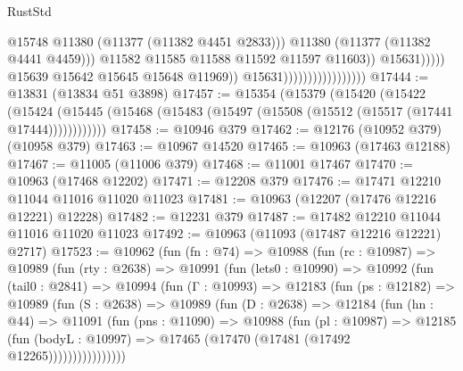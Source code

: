 \begin{lexlean}{RustStd}
\begin{coremodule}
                                                            @15748
                                                            @11380
                                                            (@11377 (@11382 @4451 @2833)))
                                                          @11380
                                                          (@11377 (@11382 @4441 @4459)))
                                                        @11582
                                                        @11585
                                                        @11588
                                                        @11592
                                                        @11597
                                                        @11603))
                                                    @15631)))))
                                          @15639
                                          @15642
                                          @15645
                                          @15648
                                          @11969))
                                      @15631)))))))))))))))))
@17444 := @13831 (@13834 @51 @3898)
@17457 := @15354
    (@15379
      (@15420
        (@15422
          (@15424 (@15445 (@15468 (@15483 (@15497 (@15508 (@15512 (@15517 (@17441 @17444))))))))))))
@17458 := @10946 @379
@17462 := @12176 (@10952 @379) (@10958 @379)
@17463 := @10967 @14520
@17465 := @10963 (@17463 @12188)
@17467 := @11005 (@11006 @379)
@17468 := @11001 @17467
@17470 := @10963 (@17468 @12202)
@17471 := @12208 @379
@17476 := @17471 @12210 @11044 @11016 @11020 @11023
@17481 := @10963 (@12207 (@17476 @12216 @12221) @12228)
@17482 := @12231 @379
@17487 := @17482 @12210 @11044 @11016 @11020 @11023
@17492 := @10963 (@11093 (@17487 @12216 @12221) @2717)
@17523 := @10962
    (fun (fn : @74) =>
    @10988
      (fun (rc : @10987) =>
      @10989
        (fun (rty : @2638) =>
        @10991
          (fun (lets0 : @10990) =>
          @10992
            (fun (tail0 : @2841) =>
            @10994
              (fun (Γ : @10993) =>
              @12183
                (fun (ps : @12182) =>
                @10989
                  (fun (S : @2638) =>
                  @10989
                    (fun (D : @2638) =>
                    @12184
                      (fun (hn : @44) =>
                      @11091
                        (fun (pns : @11090) =>
                        @10988
                          (fun (pl : @10987) =>
                          @12185
                            (fun (bodyL : @10997) =>
                            @17465 (@17470 (@17481 (@17492 @12265))))))))))))))))

\end{coremodule}
\end{lexlean}
